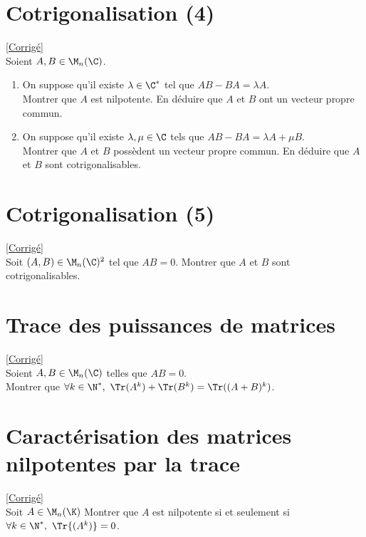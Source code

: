 \documentclass[8pt]{book}
\begin{document}
	\section{Cotrigonalisation (4) }
	\label{Cotrigonalisation (4)}
	\textcolor{blue}{\hyperref[Cotrigonalisation (4) corrigé]{[Corrigé]}}\\
	Soient $A,B\in \M_n(\C)$.
	\begin{enumerate}
		\item On suppose qu'il existe $\lambda\in \C^*$ tel que $AB-BA=\lambda A$.\\ Montrer que $A$ est nilpotente. En déduire que $A$ et $B$ ont un vecteur propre commun.
		\item On suppose qu'il existe $\lambda,\mu\in \C$ tels que $AB-BA=\lambda A+\mu B$.\\ Montrer que $A$ et $B$ possèdent un vecteur propre commun. En déduire que $A$ et $B$ sont cotrigonalisables.
	\end{enumerate}
	
	\section{Cotrigonalisation (5) }
	\label{Cotrigonalisation (5)}
	\textcolor{blue}{\hyperref[Cotrigonalisation (5) corrigé]{[Corrigé]}}\\
	Soit $(A,B)\in \M_n(\C)^2$ tel que $AB=0$. Montrer que $A$ et $B$ sont cotrigonalisables.
	
	\section{Trace des puissances de matrices }
	\label{Trace des puissances de matrices}
	\textcolor{blue}{\hyperref[Trace des puissances de matrices corrigé]{[Corrigé]}}\\
	Soient $A,B\in \M_n(\C)$ telles que $AB=0$.\\
	Montrer que $\forall k\in \N^*,\ \Tr(A^k)+\Tr(B^k)=\Tr((A+B)^k)$.
	
	\section{Caractérisation des matrices nilpotentes par la trace }
	\label{Caractérisation des matrices nilpotente par la trace}
	\textcolor{blue}{\hyperref[Caractérisation des matrices nilpotente par la trace corrigé]{[Corrigé]}}\\
	Soit $A\in \M_n(\K)$ Montrer que $A$ est nilpotente si et seulement si $\forall k\in \N^*,\ \Tr{(A^k)}=0$.
	
\end{document}
